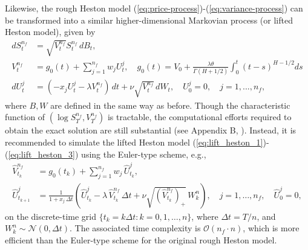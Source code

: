 \documentclass[11pt]{article}%
\theoremstyle{definition}
\begin{document}
Likewise, the rough Heston model (\ref{eq:price-process})-(\ref{eq:variance-process}) can be transformed into a similar higher-dimensional Markovian process (or lifted Heston model), given by
\begin{align}
    dS_t^{n_f} &= \sqrt{V_t^{{n_f}}}S_t^{n_f}\,dB_t,\label{eq:lift_heston_1}\\
    V_t^{n_f} &= g_0(t) + \sum_{j=1}^{n_f} w_j U_t^j,\quad g_0(t) = V_0 + \frac{\lambda \theta}{\Gamma(H+1/2)}\int_0^t (t-s)^{H-1/2} ds \label{eq:lift_heston_2}\\
    dU_t^j &= (-x_j U_t^j - \lambda V_t^{n_f})\,dt + \nu \sqrt{V_t^{n_f}}\,dW_t,\quad U_0^j = 0,\quad j=1,...,n_f,\label{eq:lift_heston_3}
\end{align}
where \(B,W\) are defined in the same way as before. Though the characteristic function of \((\log S_T^{n_f},V_T^{n_f})\) is tractable, the computational efforts required to obtain the exact solution are still substantial (see Appendix B, \cite{abijaberLifting2019}). Instead, it is recommended to simulate the lifted Heston model (\ref{eq:lift_heston_1})-(\ref{eq:lift_heston_3}) using the Euler-type scheme, e.g., 
\begin{align}
    \widehat{V}_{t_k}^{n_f} &= g_0(t_k) + \sum_{j=1}^{n_f} w_j\, \widehat{U}_{t_k}^{j},\label{eq:markov_V_update}\\
    \widehat{U}_{t_{k+1}}^{j} &= \frac{1}{1+x_j\,\Delta t} \left(
    \widehat{U}_{t_k}^{j} - \lambda\, \widehat{V}_{t_k}^{n_f}\,\Delta t + \nu \sqrt{(\widehat{V}_{t_k}^{n_f})_+}\,W_k^n
    \right),\quad j=1,\ldots,n_f, \quad \widehat{U}_{0}^{j}=0,\label{eq:markov_U_update}
\end{align} 
on the discrete-time grid \(\{t_k = k\Delta t: k=0,1,\ldots,n\}\), where \(\Delta t = T/n\), and \(W_k^n \sim \mathcal{N}(0,\Delta t)\). The associated time complexity is \(\mathcal{O}(n_f\cdot n)\), which is more efficient than the Euler-type scheme for the original rough Heston model.
\end{document}
